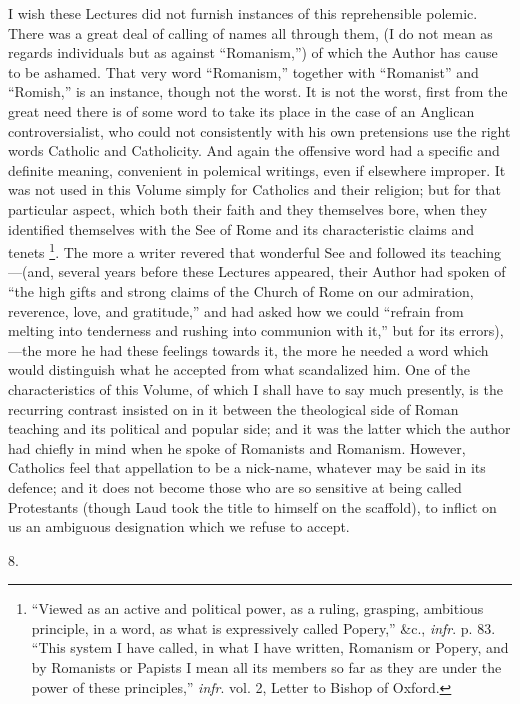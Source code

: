 I wish these Lectures did not furnish instances of this
reprehensible polemic. There was a great deal of calling of names all
through them, (I do not mean as regards individuals but as against
``Romanism,'') of which the Author has cause to be ashamed.
That very word ``Romanism,'' together with
``Romanist'' and ``Romish,'' is an instance, though
not the worst. It is not the worst, first from the great need there is
of some word to take its place in the case of an Anglican
controversialist, who could not consistently with his own pretensions
use the right words Catholic and Catholicity. And again the offensive
word had a specific and definite meaning, convenient in polemical
writings, even if elsewhere improper. It was not used in this Volume
simply for Catholics and their religion; but for that particular
aspect, which both their faith and they themselves bore, when
they identified themselves with the See of Rome and its characteristic
claims and tenets \footnote{``Viewed as an active and political power, as a ruling,
grasping, ambitious principle, in a word, as what is expressively
called Popery,'' \&c., \emph{infr}. p. 83. ``This system I
have called, in what I have written, Romanism or Popery, and by
Romanists or Papists I mean all its members so far as they are under
the power of these principles,'' \emph{infr}. vol. 2, Letter to
Bishop of Oxford.}. The
more a writer revered that wonderful See and followed its teaching—(and,
several years before these Lectures appeared, their Author had spoken
of ``the high gifts and strong claims of the Church of Rome on our
admiration, reverence, love, and gratitude,'' and had asked how we
could ``refrain from melting into tenderness and rushing into
communion with it,'' but for its errors),—the more he had these
feelings towards it, the more he needed a word which would distinguish
what he accepted from what scandalized him. One of the characteristics
of this Volume, of which I shall have to say much presently, is the
recurring contrast insisted on in it between the theological side of
Roman teaching and its political and popular side; and it was the
latter which the author had chiefly in mind when he spoke of Romanists
and Romanism. However, Catholics feel that appellation to be a
nick-name, whatever may be said in its defence; and it does not become
those who are so sensitive at being called Protestants (though Laud
took the title to himself on the scaffold), to inflict on us an
ambiguous designation which we refuse to accept.

8.


